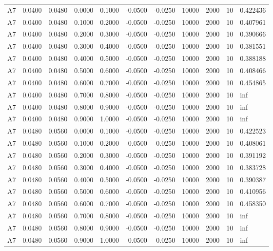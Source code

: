 \documentclass{article}
\begin{document}
\begin{longtable}{l r r r r r r r r r l}
A7 & 0.0400 & 0.0480 & 0.0000 & 0.1000 & -0.0500 & -0.0250 & 10000 & 2000 & 10 & 0.422436 \\
A7 & 0.0400 & 0.0480 & 0.1000 & 0.2000 & -0.0500 & -0.0250 & 10000 & 2000 & 10 & 0.407961 \\
A7 & 0.0400 & 0.0480 & 0.2000 & 0.3000 & -0.0500 & -0.0250 & 10000 & 2000 & 10 & 0.390666 \\
A7 & 0.0400 & 0.0480 & 0.3000 & 0.4000 & -0.0500 & -0.0250 & 10000 & 2000 & 10 & 0.381551 \\
A7 & 0.0400 & 0.0480 & 0.4000 & 0.5000 & -0.0500 & -0.0250 & 10000 & 2000 & 10 & 0.388188 \\
A7 & 0.0400 & 0.0480 & 0.5000 & 0.6000 & -0.0500 & -0.0250 & 10000 & 2000 & 10 & 0.408466 \\
A7 & 0.0400 & 0.0480 & 0.6000 & 0.7000 & -0.0500 & -0.0250 & 10000 & 2000 & 10 & 0.454865 \\
A7 & 0.0400 & 0.0480 & 0.7000 & 0.8000 & -0.0500 & -0.0250 & 10000 & 2000 & 10 & inf \\
A7 & 0.0400 & 0.0480 & 0.8000 & 0.9000 & -0.0500 & -0.0250 & 10000 & 2000 & 10 & inf \\
A7 & 0.0400 & 0.0480 & 0.9000 & 1.0000 & -0.0500 & -0.0250 & 10000 & 2000 & 10 & inf \\
A7 & 0.0480 & 0.0560 & 0.0000 & 0.1000 & -0.0500 & -0.0250 & 10000 & 2000 & 10 & 0.422523 \\
A7 & 0.0480 & 0.0560 & 0.1000 & 0.2000 & -0.0500 & -0.0250 & 10000 & 2000 & 10 & 0.408061 \\
A7 & 0.0480 & 0.0560 & 0.2000 & 0.3000 & -0.0500 & -0.0250 & 10000 & 2000 & 10 & 0.391192 \\
A7 & 0.0480 & 0.0560 & 0.3000 & 0.4000 & -0.0500 & -0.0250 & 10000 & 2000 & 10 & 0.383728 \\
A7 & 0.0480 & 0.0560 & 0.4000 & 0.5000 & -0.0500 & -0.0250 & 10000 & 2000 & 10 & 0.390387 \\
A7 & 0.0480 & 0.0560 & 0.5000 & 0.6000 & -0.0500 & -0.0250 & 10000 & 2000 & 10 & 0.410956 \\
A7 & 0.0480 & 0.0560 & 0.6000 & 0.7000 & -0.0500 & -0.0250 & 10000 & 2000 & 10 & 0.458350 \\
A7 & 0.0480 & 0.0560 & 0.7000 & 0.8000 & -0.0500 & -0.0250 & 10000 & 2000 & 10 & inf \\
A7 & 0.0480 & 0.0560 & 0.8000 & 0.9000 & -0.0500 & -0.0250 & 10000 & 2000 & 10 & inf \\
A7 & 0.0480 & 0.0560 & 0.9000 & 1.0000 & -0.0500 & -0.0250 & 10000 & 2000 & 10 & inf \\

\end{longtable}
\end{document}
